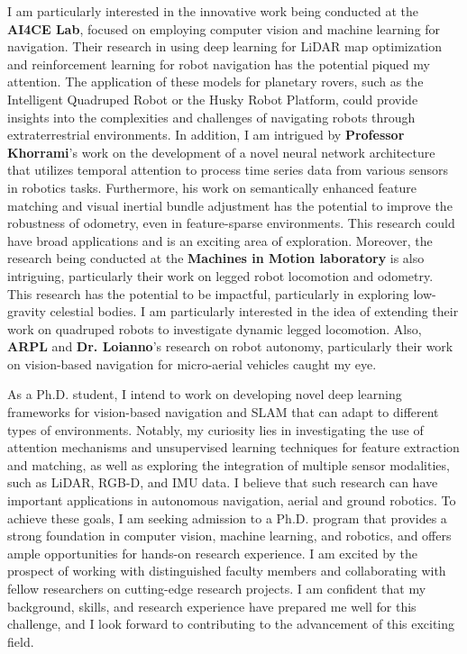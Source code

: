 \documentclass[a4,20pt]{article}
\begin{document}
\begin{large}
\vspace{-0.25cm} \quad I am particularly interested in the innovative work being conducted at the \textbf{AI4CE Lab}, focused on employing computer vision and machine learning for navigation. Their research in using deep learning for LiDAR map optimization and reinforcement learning for robot navigation has the potential piqued my attention. The application of these models for planetary rovers, such as the Intelligent Quadruped Robot or the Husky Robot Platform, could provide insights into the complexities and challenges of navigating robots through extraterrestrial environments. In addition, I am intrigued by \textbf{Professor Khorrami}'s work on the development of a novel neural network architecture that utilizes temporal attention to process time series data from various sensors in robotics tasks. Furthermore, his work on semantically enhanced feature matching and visual inertial bundle adjustment has the potential to improve the robustness of odometry, even in feature-sparse environments. This research could have broad applications and is an exciting area of exploration. Moreover, the research being conducted at the \textbf{Machines in Motion laboratory} is also intriguing, particularly their work on legged robot locomotion and odometry. This research has the potential to be impactful, particularly in exploring low-gravity celestial bodies. I am particularly interested in the idea of extending their work on quadruped robots to investigate dynamic legged locomotion. Also, \textbf{ARPL} and \textbf{Dr. Loianno}'s research on robot autonomy, particularly their work on vision-based navigation for micro-aerial vehicles caught my eye. \par

\vspace{-0.25cm} \quad As a Ph.D. student, I intend to work on developing novel deep learning frameworks for vision-based navigation and SLAM that can adapt to different types of environments. Notably, my curiosity lies in investigating the use of attention mechanisms and unsupervised learning techniques for feature extraction and matching, as well as exploring the integration of multiple sensor modalities, such as LiDAR, RGB-D, and IMU data. I believe that such research can have important applications in autonomous navigation, aerial and ground robotics. To achieve these goals, I am seeking admission to a Ph.D. program that provides a strong foundation in computer vision, machine learning, and robotics, and offers ample opportunities for hands-on research experience. I am excited by the prospect of working with distinguished faculty members and collaborating with fellow researchers on cutting-edge research projects. I am confident that my background, skills, and research experience have prepared me well for this challenge, and I look forward to contributing to the advancement of this exciting field. \par


\end{large}
\end{document}
